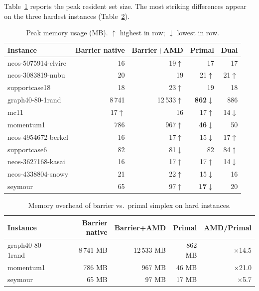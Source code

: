 \documentclass[11pt,a4paper]{article}
\begin{document}
Table~\ref{tab:memory} reports the peak resident set size.  The most
striking differences appear on the three hardest instances
(Table~\ref{tab:memhighlight}).

\begin{table}[h]
\centering
\caption{Peak memory usage (MB). $\uparrow$ highest in row;
         $\downarrow$ lowest in row.}
\label{tab:memory}
\setlength{\tabcolsep}{5pt}
\begin{tabular}{@{}lrrrr@{}}
\toprule
\textbf{Instance}
  & \textbf{Barrier native}
  & \textbf{Barrier+AMD}
  & \textbf{Primal}
  & \textbf{Dual} \\
\midrule
neos-5075914-elvire & 16 & 19$\uparrow$ & 17 & 17 \\
neos-3083819-nubu   & 20 & 19 & 21$\uparrow$ & 21$\uparrow$ \\
supportcase18       & 18 & 23$\uparrow$ & 19 & 18 \\
graph40-80-1rand    & 8\,741 & \cellcolor{badcell}12\,533$\uparrow$ & \textbf{862}$\downarrow$ & 886 \\
mc11                & 17$\uparrow$ & 16 & 17$\uparrow$ & 14$\downarrow$ \\
momentum1           & 786 & \cellcolor{badcell}967$\uparrow$ & \textbf{46}$\downarrow$ & 50 \\
neos-4954672-berkel & 16 & 17$\uparrow$ & 15$\downarrow$ & 17$\uparrow$ \\
supportcase6        & 82 & 81$\downarrow$ & 82 & 84$\uparrow$ \\
neos-3627168-kasai  & 16 & 17$\uparrow$ & 17$\uparrow$ & 14$\downarrow$ \\
neos-4338804-snowy  & 21 & 22$\uparrow$ & 15$\downarrow$ & 16 \\
seymour             & 65 & \cellcolor{badcell}97$\uparrow$ & \textbf{17}$\downarrow$ & 20 \\
\bottomrule
\end{tabular}
\end{table}

\begin{table}[h]
\centering
\caption{Memory overhead of barrier vs.\ primal simplex on hard instances.}
\label{tab:memhighlight}
\begin{tabular}{@{}lrrrr@{}}
\toprule
\textbf{Instance} & \textbf{Barrier native} & \textbf{Barrier+AMD} & \textbf{Primal} & \textbf{AMD/Primal} \\
\midrule
graph40-80-1rand & 8\,741 MB & 12\,533 MB & 862 MB & $\times$14.5 \\
momentum1        & 786 MB    & 967 MB     & 46 MB  & $\times$21.0 \\
seymour          & 65 MB     & 97 MB      & 17 MB  & $\times$5.7  \\
\bottomrule
\end{tabular}
\end{table}
\end{document}
